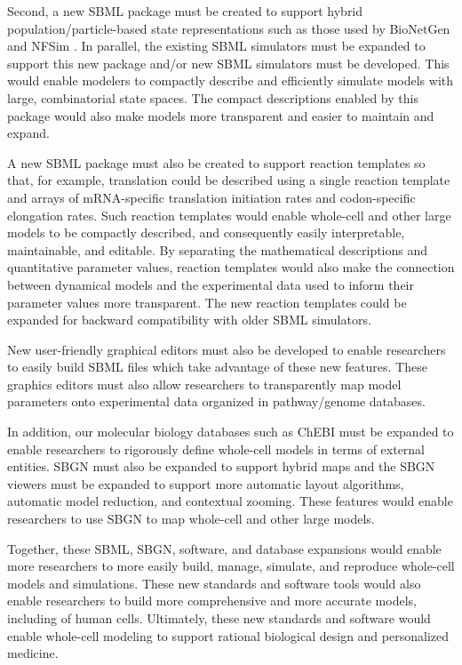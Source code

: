 \documentclass[journal,transmag]{IEEEtran}
\begin{document}
Second, a new SBML package must be created to support hybrid population/particle-based state representations such as those used by BioNetGen \cite{Hlavacek2006, Hogg2014} and NFSim \cite{Sneddon2011}. In parallel, the existing SBML simulators must be expanded to support this new package and/or new SBML simulators must be developed. This would enable modelers to compactly describe and efficiently simulate models with large, combinatorial state spaces. The compact descriptions enabled by this package would also make models more transparent and easier to maintain and expand. 

A new SBML package must also be created to support reaction templates so that, for example, translation could be described using a single reaction template and arrays of mRNA-specific translation initiation rates and codon-specific elongation rates. Such reaction templates would enable whole-cell and other large models to be compactly described, and consequently easily interpretable, maintainable, and editable. By separating the mathematical descriptions and quantitative parameter values, reaction templates would also make the connection between dynamical models and the experimental data used to inform their parameter values more transparent. The new reaction templates could be expanded for backward compatibility with older SBML simulators.

New user-friendly graphical editors must also be developed to enable researchers to easily build SBML files which take advantage of these new features. These graphics editors must also allow researchers to transparently map model parameters onto experimental data organized in pathway/genome databases.

In addition, our molecular biology databases such as ChEBI must be expanded to enable researchers to rigorously define whole-cell models in terms of external entities. SBGN must also be expanded to support hybrid maps and the SBGN viewers must be expanded to support more automatic layout algorithms, automatic model reduction, and contextual zooming. These features would enable researchers to use SBGN to map whole-cell and other large models.

Together, these SBML, SBGN, software, and database expansions would enable more researchers to more easily build, manage, simulate, and reproduce whole-cell models and simulations. These new standards and software tools would also enable researchers to build more comprehensive and more accurate models, including of human cells. Ultimately, these new standards and software would enable whole-cell modeling to support rational biological design and personalized medicine.
\end{document}
